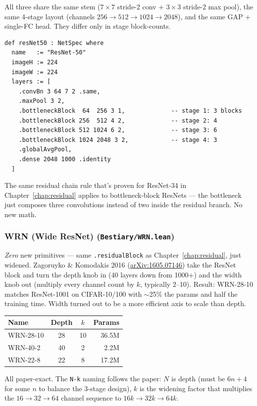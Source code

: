 All three share the same stem ($7\times 7$ stride-2 conv +
$3\times 3$ stride-2 max pool), the same 4-stage layout (channels
$256 \to 512 \to 1024 \to 2048$), and the same GAP + single-FC
head. They differ only in stage block-counts.

\begin{verbatim}
def resNet50 : NetSpec where
  name   := "ResNet-50"
  imageH := 224
  imageW := 224
  layers := [
    .convBn 3 64 7 2 .same,
    .maxPool 3 2,
    .bottleneckBlock  64  256 3 1,             -- stage 1: 3 blocks
    .bottleneckBlock 256  512 4 2,             -- stage 2: 4
    .bottleneckBlock 512 1024 6 2,             -- stage 3: 6
    .bottleneckBlock 1024 2048 3 2,            -- stage 4: 3
    .globalAvgPool,
    .dense 2048 1000 .identity
  ]
\end{verbatim}

The same residual chain rule that's proven for ResNet-34 in
Chapter~\ref{chap:residual} applies to bottleneck-block ResNets ---
the bottleneck just composes three convolutions instead of two
inside the residual branch. No new math.

\subsubsection*{WRN (Wide ResNet) (\texttt{Bestiary/WRN.lean})}
\emph{Zero} new primitives --- same \texttt{.residualBlock} as
Chapter~\ref{chap:residual}, just widened. Zagoruyko \& Komodakis
2016 (\href{https://arxiv.org/abs/1605.07146}{arXiv:1605.07146})
take the ResNet block and turn the depth knob in (40 layers down
from 1000+) and the width knob out (multiply every channel count
by $k$, typically 2--10). Result: WRN-28-10 matches ResNet-1001 on
CIFAR-10/100 with $\sim$25\% the params and half the training
time. Width turned out to be a more efficient axis to scale than
depth.

\begin{center}
\begin{tabular}{l c c r}
\hline
Name      & Depth & $k$  & Params \\
\hline
WRN-28-10 & 28    & 10   & 36.5M  \\
WRN-40-2  & 40    & 2    &  2.2M  \\
WRN-22-8  & 22    & 8    & 17.2M  \\
\hline
\end{tabular}
\end{center}

All paper-exact. The \texttt{N-k} naming follows the paper:
$N$ is depth (must be $6n+4$ for some $n$ to balance the 3-stage
design), $k$ is the widening factor that multiplies the
$16 \to 32 \to 64$ channel sequence to $16k \to 32k \to 64k$.

